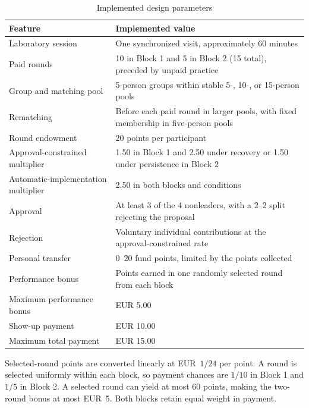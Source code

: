 \documentclass[11pt]{article}
\begin{document}
\begin{table}[H]
\centering
\caption{Implemented design parameters}
\label{tab:parameters}
\begin{threeparttable}
\begin{tabularx}{\textwidth}{>{\raggedright\arraybackslash}p{} X}
\toprule
Feature & Implemented value \\
\midrule
Laboratory session & One synchronized visit, approximately 60 minutes \\
Paid rounds & 10 in Block 1 and 5 in Block 2 (15 total), preceded by unpaid practice \\
Group and matching pool & 5-person groups within stable 5-, 10-, or 15-person pools \\
Rematching & Before each paid round in larger pools, with fixed membership in five-person pools \\
Round endowment & 20 points per participant \\
Approval-constrained multiplier & 1.50 in Block 1 and 2.50 under recovery or 1.50 under persistence in Block 2 \\
Automatic-implementation multiplier & 2.50 in both blocks and conditions \\
Approval & At least 3 of the 4 nonleaders, with a 2--2 split rejecting the proposal \\
Rejection & Voluntary individual contributions at the approval-constrained rate \\
Personal transfer & 0--20 fund points, limited by the points collected \\
Performance bonus & Points earned in one randomly selected round from each block \\
Maximum performance bonus & EUR 5.00 \\
Show-up payment & EUR 10.00 \\
Maximum total payment & EUR 15.00 \\
\bottomrule
\end{tabularx}
\begin{tablenotes}[flushleft]\footnotesize
\item Selected-round points are converted linearly at EUR~$1/24$ per point. A round is selected uniformly within each block, so payment chances are $1/10$ in Block 1 and $1/5$ in Block 2. A selected round can yield at most 60 points, making the two-round bonus at most EUR~5. Both blocks retain equal weight in payment.
\end{tablenotes}
\end{threeparttable}
\end{table}
\end{document}
